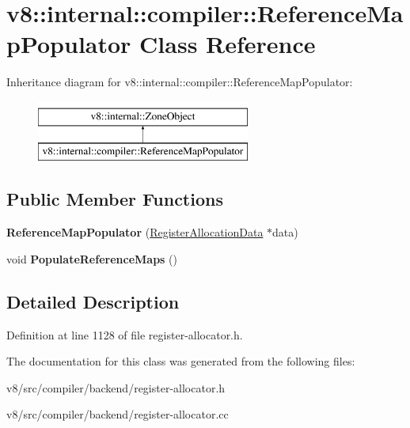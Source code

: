 \hypertarget{classv8_1_1internal_1_1compiler_1_1ReferenceMapPopulator}{}\section{v8\+:\+:internal\+:\+:compiler\+:\+:Reference\+Map\+Populator Class Reference}
\label{classv8_1_1internal_1_1compiler_1_1ReferenceMapPopulator}
Inheritance diagram for v8\+:\+:internal\+:\+:compiler\+:\+:Reference\+Map\+Populator\+:\begin{figure}[H]
\begin{center}
\leavevmode
\includegraphics[height=2.000000cm]{classv8_1_1internal_1_1compiler_1_1ReferenceMapPopulator}
\end{center}
\end{figure}
\subsection*{Public Member Functions}
\begin{DoxyCompactItemize}
\item 
\mbox{\label{classv8_1_1internal_1_1compiler_1_1ReferenceMapPopulator_aa2bab56c73daa6fb0ef0d1aa17356177}} 
{\bfseries Reference\+Map\+Populator} (\mbox{\hyperlink{classv8_1_1internal_1_1compiler_1_1RegisterAllocationData}{Register\+Allocation\+Data}} $\ast$data)
\item 
\mbox{\label{classv8_1_1internal_1_1compiler_1_1ReferenceMapPopulator_aa5b8cd9b9b7b7ce4b30f775a6f1c3cf6}} 
void {\bfseries Populate\+Reference\+Maps} ()
\end{DoxyCompactItemize}


\subsection{Detailed Description}


Definition at line 1128 of file register-\/allocator.\+h.



The documentation for this class was generated from the following files\+:\begin{DoxyCompactItemize}
\item 
v8/src/compiler/backend/register-\/allocator.\+h\item 
v8/src/compiler/backend/register-\/allocator.\+cc\end{DoxyCompactItemize}
